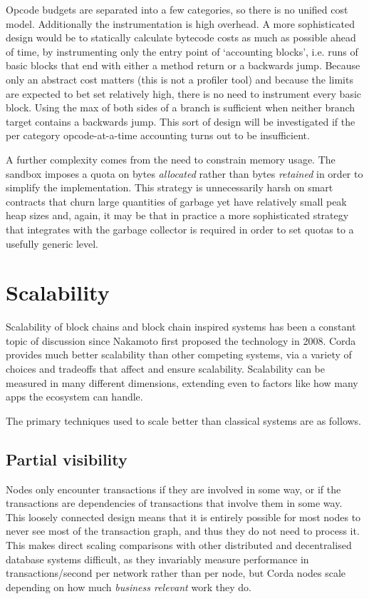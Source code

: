 \documentclass{article}
\begin{document}
Opcode budgets are separated into a few categories, so there is no unified cost model. Additionally the instrumentation is
high overhead. A more sophisticated design would be to statically calculate bytecode costs as much as possible
ahead of time, by instrumenting only the entry point of `accounting blocks', i.e. runs of basic blocks that end
with either a method return or a backwards jump. Because only an abstract cost matters (this is not a profiler
tool) and because the limits are expected to bet set relatively high, there is no need to instrument every basic
block. Using the max of both sides of a branch is sufficient when neither branch target contains a backwards jump.
This sort of design will be investigated if the per category opcode-at-a-time accounting turns out to be
insufficient.

A further complexity comes from the need to constrain memory usage. The sandbox imposes a quota on bytes
\emph{allocated} rather than bytes \emph{retained} in order to simplify the implementation. This strategy is
unnecessarily harsh on smart contracts that churn large quantities of garbage yet have relatively small peak heap
sizes and, again, it may be that in practice a more sophisticated strategy that integrates with the garbage
collector is required in order to set quotas to a usefully generic level.

\section{Scalability}\label{sec:scalability}

Scalability of block chains and block chain inspired systems has been a constant topic of discussion since Nakamoto
first proposed the technology in 2008. Corda provides much better scalability than other competing systems, via a
variety of choices and tradeoffs that affect and ensure scalability. Scalability can be measured in many different
dimensions, extending even to factors like how many apps the ecosystem can handle.

The primary techniques used to scale better than classical systems are as follows.

\subsection{Partial visibility}\label{subsec:partial-visibility}

Nodes only encounter transactions if they are involved in some way, or if the transactions are dependencies of
transactions that involve them in some way. This loosely connected design means that it is entirely possible for
most nodes to never see most of the transaction graph, and thus they do not need to process it. This makes direct
scaling comparisons with other distributed and decentralised database systems difficult, as they invariably measure
performance in transactions/second per network rather than per node, but Corda nodes scale depending on how much
\emph{business relevant} work they do.
\end{document}
